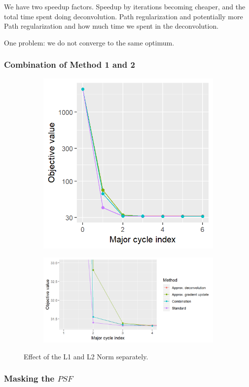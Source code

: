We have two speedup factors. Speedup by iterations becoming cheaper, and the total time spent doing deconvolution.
Path regularization and potentially more
Path regularization and how much time we spent in the deconvolution.

One problem: we do not converge to the same optimum.

\subsubsection{Combination of Method 1 and 2}

\begin{figure}[h]
	\centering
	\begin{subfigure}[b]{0.33\linewidth}
		\includegraphics[width=\linewidth]{./chapters/10.results/gradient/comparison.png}
	\end{subfigure}
	\begin{subfigure}[b]{0.66\linewidth}
		\includegraphics[width=\linewidth]{./chapters/10.results/gradient/comparison_zoom.png}
	\end{subfigure}
	
	\caption{Effect of the L1 and L2 Norm separately.}
	\label{results:gradients:comparison}
\end{figure}

\subsubsection{Masking the $PSF$}
